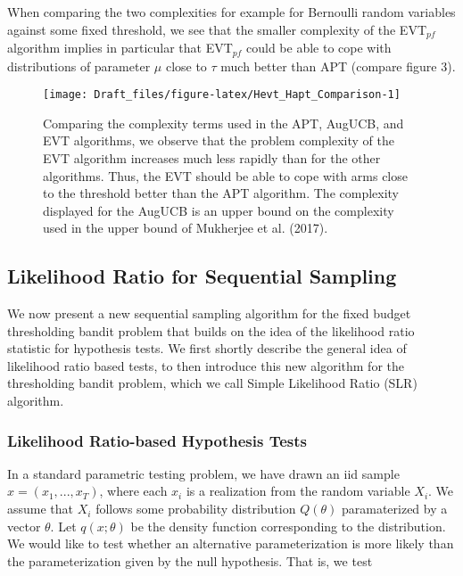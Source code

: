 \documentclass[11pt,]{article}
\begin{document}
When comparing the two complexities for example for Bernoulli random
variables against some fixed threshold, we see that the smaller
complexity of the EVT\(_{pf}\) algorithm implies in particular that
EVT\(_{pf}\) could be able to cope with distributions of parameter
\(\mu\) close to \(\tau\) much better than APT (compare figure 3).

\begin{figure}

{\centering \texttt{[image: Draft\_files/figure-latex/Hevt\_Hapt\_Comparison-1]} 

}

\caption{Comparing the complexity terms used in the APT, AugUCB, and EVT algorithms, we observe that the problem complexity of the EVT algorithm increases much less rapidly than for the other algorithms. Thus, the EVT should be able to cope with arms close to the threshold better than the APT algorithm. The complexity displayed for the AugUCB is an upper bound on the complexity used in the upper bound of Mukherjee et al. (2017).}\label{fig:Hevt_Hapt_Comparison}
\end{figure}

\subsection{\texorpdfstring{Likelihood Ratio for Sequential Sampling
\label{sec:LikelihoodRatioForExponentialFamily}}{Likelihood Ratio for Sequential Sampling }}\label{likelihood-ratio-for-sequential-sampling}

We now present a new sequential sampling algorithm for the fixed budget
thresholding bandit problem that builds on the idea of the likelihood
ratio statistic for hypothesis tests. We first shortly describe the
general idea of likelihood ratio based tests, to then introduce this new
algorithm for the thresholding bandit problem, which we call Simple
Likelihood Ratio (SLR) algorithm.

\subsubsection{\texorpdfstring{Likelihood Ratio-based Hypothesis Tests
\label{sec:LRTests}}{Likelihood Ratio-based Hypothesis Tests }}\label{likelihood-ratio-based-hypothesis-tests}

In a standard parametric testing problem, we have drawn an iid sample
\(x = (x_1, ..., x_T)\), where each \(x_i\) is a realization from the
random variable \(X_i\). We assume that \(X_i\) follows some probability
distribution \(Q(\theta)\) paramaterized by a vector \(\theta\). Let
\(q(x;\theta)\) be the density function corresponding to the
distribution. We would like to test whether an alternative
parameterization is more likely than the parameterization given by the
null hypothesis. That is, we test
\end{document}
